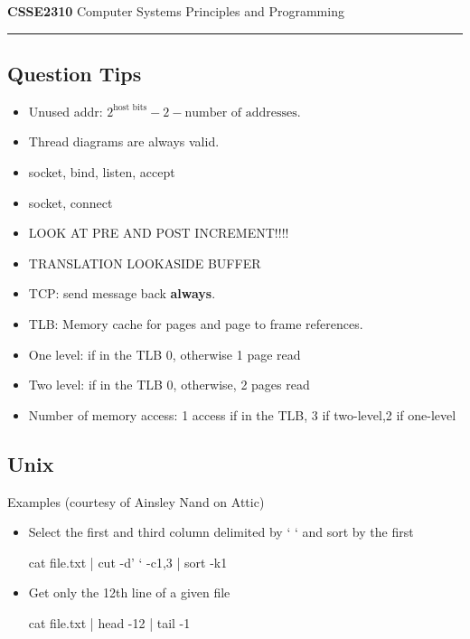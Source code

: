 \documentclass[10pt, a4paper]{article}
\begin{document}
\huge

    \textbf{\color{blue}CSSE2310} Computer Systems Principles and Programming
    
    \color{blue}
    \rule{\textwidth}{1.5em}
    \color{black}
    \tiny

\begin{multicols}{4}
    \subsection*{Question Tips}
    \begin{itemize}
        \item Unused addr: $2^{\text{host bits}}- 2 - \text{number of addresses}$.
        \item Thread diagrams are always valid.
        \item socket, bind, listen, accept
        \item socket, connect
        \item LOOK AT PRE AND POST INCREMENT!!!!
        \item TRANSLATION LOOKASIDE BUFFER
        \item TCP: send message back \textbf{always}.
        \item TLB: Memory cache for pages and page to frame references.
        \item One level: if in the TLB 0, otherwise 1 page read
        \item Two level: if in the TLB 0, otherwise, 2 pages read
        \item Number of memory access: 1 access if in the TLB, 3 if two-level,2 if one-level
    \end{itemize}
    

    \subsection*{Unix}
    Examples (courtesy of Ainsley Nand on Attic)
    \begin{itemize}
    \item Select the first and third column delimited by ‘ ‘
    and sort by the first

    cat file.txt | cut -d’ ‘ -c1,3 | sort -k1

    \item Get only the 12th line of a given file

    cat file.txt | head -12 | tail -1


\end{itemize}
\end{multicols}
\end{document}
